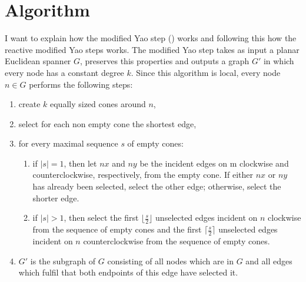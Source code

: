 \section{Algorithm}

I want to explain how the modified Yao step (\cite{kanj}) works and following this how the reactive modified Yao steps works.
The modified Yao step takes as input a planar Euclidean spanner $G $, preserves this properties and outputs a graph $G' $ in which every node has a constant degree $k $.
Since this algorithm is local, every node $n\in G $ performs the following steps:

\begin{enumerate}
\item create $k $ equally sized cones around $n $,
\item select for each non empty cone the shortest edge,
\item for every maximal sequence $s $ of empty cones:
\begin{enumerate}
	\item if $|s|=1 $, then let $nx $ and $ny $ be the incident edges on m clockwise and counterclockwise, respectively, from the empty cone.
	If either $nx $ or $ny $ has already been selected, select the other edge;
	otherwise, select the shorter edge.
\item if $|s| > 1 $, then select the first $\lfloor \frac{s}{2} \rfloor $ unselected edges incident on $n $ clockwise from the sequence of empty cones and the first $\lceil \frac{s}{2} \rceil $ unselected edges incident on $n $ counterclockwise from the sequence of empty cones.
\end{enumerate}
\item $ G' $ is the subgraph of $G $ consisting of all nodes which are in $G $ and all edges which fulfil that both endpoints of this edge have selected it.  
\end{enumerate}